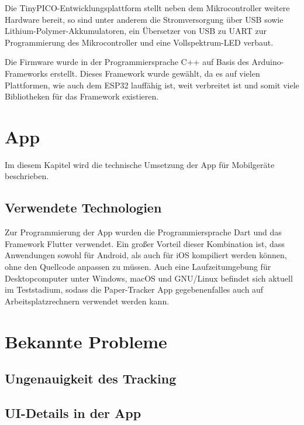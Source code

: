 Die TinyPICO-Entwicklungsplattform stellt neben dem Mikrocontroller weitere Hardware bereit, so sind
unter anderem
die Stromversorgung über \gls{USB} sowie Lithium-Polymer-Akkumulatoren, ein Übersetzer von \gls{USB}
zu \gls{UART} zur Programmierung des Mikrocontroller und eine Vollspektrum-\gls{LED} verbaut.


Die Firmware wurde in der Programmiersprache C++ auf Basis des Arduino-Frameworks erstellt. Dieses
Framework wurde gewählt, da es auf vielen Plattformen, wie auch dem ESP32 lauffähig ist, weit
verbreitet ist und somit viele Bibliotheken für das Framework existieren.


\section{App}

Im diesem Kapitel wird die technische Umsetzung der App für Mobilgeräte beschrieben.

\subsection{Verwendete Technologien}

Zur Programmierung der App wurden die Programmiersprache Dart und das Framework Flutter verwendet.
Ein großer Vorteil dieser Kombination ist, dass Anwendungen sowohl für Android, als auch für iOS
kompiliert werden können, ohne den Quellcode anpassen zu müssen. Auch eine Laufzeitumgebung für
Desktopcomputer unter Windows, macOS und GNU/Linux befindet sich aktuell im Teststadium, sodass die
Paper-Tracker App gegebenenfalles auch auf Arbeitsplatzrechnern verwendet werden kann.

\section{Bekannte Probleme}
\subsection{Ungenauigkeit des Tracking}

\subsection{UI-Details in der App}
